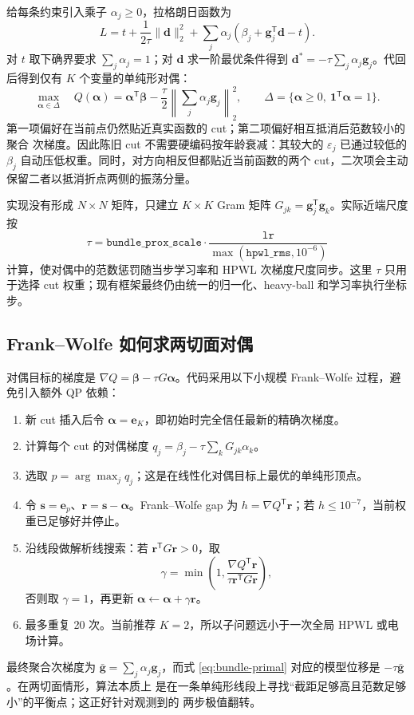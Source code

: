 \documentclass[UTF8,fontset=windows,a4paper,11pt]{ctexart}
\begin{document}
给每条约束引入乘子 $\alpha_j\geq0$，拉格朗日函数为
\begin{equation}
 L=t+\frac{1}{2\tau}\|\bm d\|_2^2+
 \sum_j\alpha_j(\beta_j+\bm g_j^\mathsf{T}\bm d-t).
\end{equation}
对 $t$ 取下确界要求 $\sum_j\alpha_j=1$；对 $\bm d$ 求一阶最优条件得到
$\bm d^*=-\tau\sum_j\alpha_j\bm g_j$。代回后得到仅有 $K$ 个变量的单纯形对偶：
\begin{equation}
 \max_{\bm\alpha\in\Delta}\quad
 Q(\bm\alpha)=\bm\alpha^\mathsf{T}\bm\beta-
 \frac{\tau}{2}\left\|\sum_j\alpha_j\bm g_j\right\|_2^2,
 \qquad
 \Delta=\{\bm\alpha\geq0,\ \bm1^\mathsf{T}\bm\alpha=1\}.
 \label{eq:bundle-dual}
\end{equation}
第一项偏好在当前点仍然贴近真实函数的 cut；第二项偏好相互抵消后范数较小的聚合
次梯度。因此陈旧 cut 不需要硬编码按年龄衰减：其较大的 $\varepsilon_j$ 已通过较低的
$\beta_j$ 自动压低权重。同时，对方向相反但都贴近当前函数的两个 cut，二次项会主动
保留二者以抵消折点两侧的振荡分量。

实现没有形成 $N\times N$ 矩阵，只建立 $K\times K$ Gram 矩阵
$G_{jk}=\bm g_j^\mathsf{T}\bm g_k$。实际近端尺度按
\begin{equation}
 \tau=\texttt{bundle\_prox\_scale}\cdot
       \frac{\texttt{lr}}{\max(\texttt{hpwl\_rms},10^{-6})}
\end{equation}
计算，使对偶中的范数惩罚随当步学习率和 HPWL 次梯度尺度同步。这里 $\tau$ 只用于选择
cut 权重；现有框架最终仍由统一的归一化、heavy-ball 和学习率执行坐标步。

\subsection{Frank--Wolfe 如何求两切面对偶}

对偶目标的梯度是 $\nabla Q=\bm\beta-\tau G\bm\alpha$。代码采用以下小规模
Frank--Wolfe 过程，避免引入额外 QP 依赖：
\begin{enumerate}
  \item 新 cut 插入后令 $\bm\alpha=\bm e_K$，即初始时完全信任最新的精确次梯度。
  \item 计算每个 cut 的对偶梯度
  $q_j=\beta_j-\tau\sum_kG_{jk}\alpha_k$。
  \item 选取 $p=\arg\max_j q_j$；这是在线性化对偶目标上最优的单纯形顶点。
  \item 令 $\bm s=\bm e_p$、$\bm r=\bm s-\bm\alpha$。Frank--Wolfe gap
  为 $h=\nabla Q^\mathsf{T}\bm r$；若 $h\leq10^{-7}$，当前权重已足够好并停止。
  \item 沿线段做解析线搜索：若 $\bm r^\mathsf{T}G\bm r>0$，取
  \begin{equation}
    \gamma=\min\!\left(1,
    \frac{\nabla Q^\mathsf{T}\bm r}
         {\tau\bm r^\mathsf{T}G\bm r}\right),
  \end{equation}
  否则取 $\gamma=1$，再更新
  $\bm\alpha\leftarrow\bm\alpha+\gamma\bm r$。
  \item 最多重复 20 次。当前推荐 $K=2$，所以子问题远小于一次全局 HPWL 或电场计算。
\end{enumerate}
最终聚合次梯度为 $\bar{\bm g}=\sum_j\alpha_j\bm g_j$，而式
\eqref{eq:bundle-primal} 对应的模型位移是 $-\tau\bar{\bm g}$。在两切面情形，算法本质上
是在一条单纯形线段上寻找“截距足够高且范数足够小”的平衡点；这正好针对观测到的
两步极值翻转。
\end{document}
